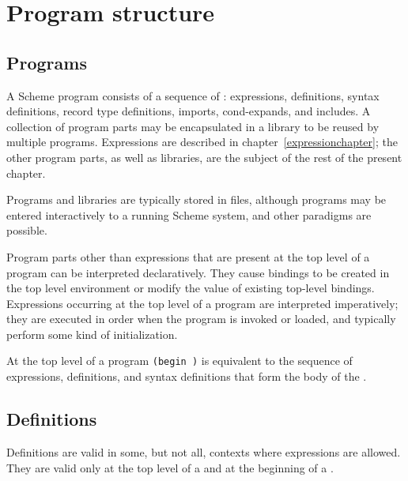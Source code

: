 \chapter{Program structure}
\label{programchapter}

\section{Programs}

A Scheme program consists of a sequence of 
: expressions, definitions, syntax definitions,
record type definitions, imports, cond-expands, and includes.  A collection of program
parts may be encapsulated in a library to be reused by multiple
programs.
Expressions are described in chapter~\ref{expressionchapter};
the other program parts, as well as libraries, are the subject of the
rest of the present chapter.

Programs and libraries are typically stored in files, although programs
may be entered interactively to a running Scheme system, and other
paradigms are possible.



Program parts other than expressions that are present
at the top level of a program can be interpreted declaratively.
They cause bindings to be created in the top level
environment or modify the value of existing top-level bindings.
Expressions occurring at the top level of a program are
interpreted imperatively; they are executed in order when the program is
invoked or loaded, and typically perform some kind of initialization.


At the top level of a program {\tt(begin  \dotsfoo)} is
equivalent to the sequence of expressions, definitions, and syntax definitions
that form the body of the .


\section{Definitions}
\label{defines}

Definitions are valid in some, but not all, contexts where expressions
are allowed.  They are valid only at the top level of a 
and at the beginning of a .

